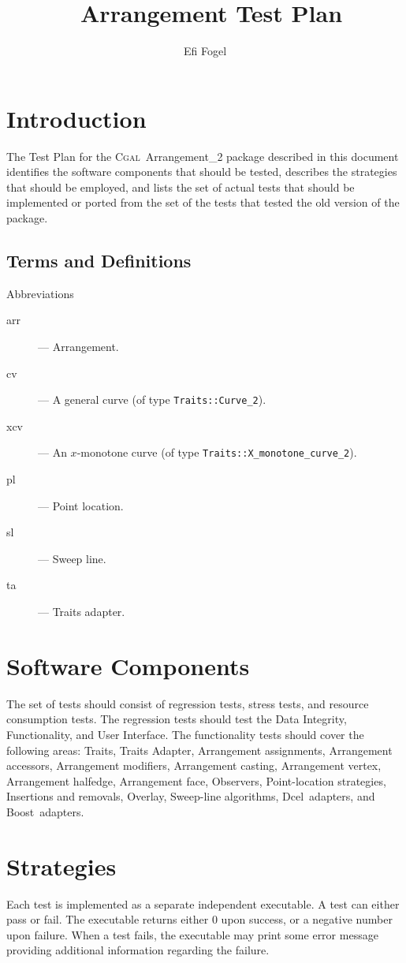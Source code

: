 \documentclass[11pt,a4paper]{article}
\title{\cgal\ Arrangement Test Plan}
\author{Efi Fogel}
\newcommand{\cgal}{\textsc{Cgal}}
\newcommand{\dcel}{{\sc Dcel}}
\newcommand{\boost}{{\sc Boost}}
\begin{document}
\maketitle
%
\section{Introduction}
The Test Plan for the \cgal\ Arrangement\_2 package described in this
document identifies the software components that should be tested,
describes the strategies that should be employed, and lists the set of
actual tests that should be implemented or ported from the set of the
tests that tested the old version of the package.
\subsection{Terms and Definitions}
Abbreviations
\begin{description}
  \item[arr] --- Arrangement.
  \item[cv] --- A general curve (of type {\tt Traits::Curve\_2}).
  \item[xcv] --- An $x$-monotone curve (of type
    {\tt Traits::X\_monotone\_curve\_2}).
  \item[pl] --- Point location.
  \item[sl] --- Sweep line.
  \item[ta] --- Traits adapter.
\end{description}
%

\section{Software Components}
%
The set of tests should consist of regression tests, stress tests,
and resource consumption tests. The regression tests should test the
Data Integrity, Functionality, and User Interface. The functionality
tests should cover the following areas:
Traits, Traits Adapter, Arrangement assignments, Arrangement
accessors, Arrangement modifiers, Arrangement casting, Arrangement
vertex, Arrangement halfedge, Arrangement face, Observers,
Point-location strategies, Insertions and removals, Overlay,
Sweep-line algorithms, \dcel\ adapters, and \boost\ adapters.

%
\section{Strategies}
Each test is implemented as a separate independent executable. A test can
either pass or fail. The executable returns either 0 upon success, or
a negative number upon failure. When a test fails, the executable may
print some error message providing additional information regarding
the failure.
\end{document}
